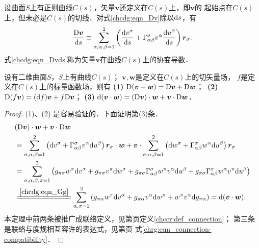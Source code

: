 设曲面$S$上有正则曲线$C(s)$，矢量$\boldsymbol{v}$还定义在$C(s)$上，即$\boldsymbol{v}$的
起始点在$C(s)$上，但未必是$C(s)$的切线．对式\eqref{chcdg:eqn_Dv}除以${\rm d}s$，有
\begin{equation}\label{chcdg:eqn_Dvds}
    \frac{{\rm D} \boldsymbol{v}}{{\rm d}s} \equiv \sum_{\sigma,\alpha,\beta=1}^{2} 
    \left( \frac{\mathrm{d} v^\sigma } {{\rm d}s}
    +  \Gamma_{\alpha \beta}^\sigma v^\alpha 
    \frac{\mathrm{d} u^\beta}{{\rm d}s}  \right) \boldsymbol{r}_\sigma .
\end{equation}
式\eqref{chcdg:eqn_Dvds}称为矢量$\boldsymbol{v}$在曲线$C(s)$上的{\heiti 协变导数}．

\begin{theorem}\label{chcdg:thm_connection}
    设有二维曲面$S$，$S$上有曲线$C(s)$；
    $\boldsymbol{v}, \boldsymbol{w}$是定义在$C(s)$上的切矢量场，
    $f$是定义在$C(s)$上的标量函数场，则有    
    {\bfseries (1)} ${\rm D}(\boldsymbol{v}+\boldsymbol{w})={\rm D} \boldsymbol{v}+{\rm D} \boldsymbol{w}$；$\ $    
    {\bfseries (2)} ${\rm D}(f \boldsymbol{v})=(\mathrm{d} f)  \boldsymbol{v}+f {\rm D} \boldsymbol{v}$；%
    {\bfseries (3)} $\mathrm{d}(\boldsymbol{v} \cdot \boldsymbol{w})=({\rm D} \boldsymbol{v}) 
    \cdot \boldsymbol{w} +\boldsymbol{v} \cdot {\rm D} \boldsymbol{w}$．
\end{theorem}
\begin{proof}
    (1)、(2) 是容易验证的．下面证明第(3)条．
    \begin{align*}
        & ({\rm D} \boldsymbol{v}) \cdot \boldsymbol{w} + \boldsymbol{v} \cdot {\rm D} \boldsymbol{w} \\
        &=  \sum_{\sigma,\alpha,\beta=1}^{2} \left(\mathrm{d} v^\sigma  
        +  \Gamma_{\alpha \beta}^\sigma v^\alpha \mathrm{d} u^\beta  \right) \boldsymbol{r}_\sigma 
         \cdot \boldsymbol{w} + \boldsymbol{v} \cdot 
           \sum_{\sigma,\alpha,\beta=1}^{2} \left(\mathrm{d} w^\sigma  
           +  \Gamma_{\alpha \beta}^\sigma w^\alpha \mathrm{d} u^\beta  \right) \boldsymbol{r}_\sigma \\
         &= \sum_{\sigma,\alpha,\beta,\pi=1}^{2} \left( g_{\pi \sigma} w^\pi  \mathrm{d} v^\sigma  
          +  g_{\pi \sigma} v^\pi  \mathrm{d} w^\sigma  
          +  g_{\pi \sigma} \Gamma_{\alpha \beta}^\sigma w^\pi v^\alpha \mathrm{d} u^\beta 
          +  g_{\pi \sigma} \Gamma_{\alpha \beta}^\sigma w^\alpha v^\pi \mathrm{d} u^\beta  \right)  \\  
         &\xlongequal{\ref{chcdg:eqn_Gg}}
         \sum_{\alpha,\pi=1}^{2} \left( g_{\pi \alpha} w^\pi  \mathrm{d} v^\alpha  
         +  g_{\pi \alpha} v^\alpha  \mathrm{d} w^\pi  
         +  w^\pi v^\alpha \mathrm{d} g_{\pi \alpha}   \right)  
         =\mathrm{d} (\boldsymbol{v} \cdot \boldsymbol{w}) .
    \end{align*} 
    本定理中前两条被推广成{\kaishu 联络}定义，见第\pageref{chccr:def_connection}页定义\ref{chccr:def_connection}；
第三条是联络与度规相互容许的表达式，见第\pageref{chrg:eqn_connection-compatibility}页
式\eqref{chrg:eqn_connection-compatibility}．
\end{proof}

